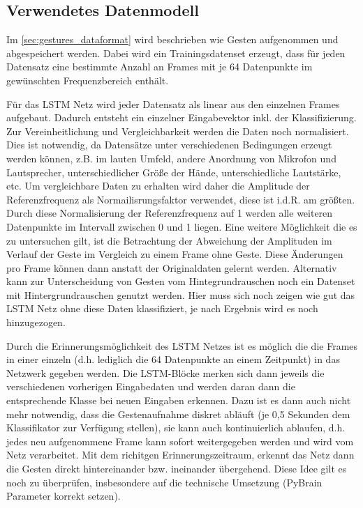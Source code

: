 \subsection{Verwendetes Datenmodell}
\label{sec:lstm_data}

Im \autoref{sec:gestures_dataformat} wird beschrieben wie Gesten aufgenommen und
abgespeichert werden. Dabei wird ein Trainingsdatenset erzeugt, dass für
jeden Datensatz eine bestimmte Anzahl an Frames mit je 64 Datenpunkte im
gewünschten Frequenzbereich enthält. 

Für das \ac{LSTM} Netz wird jeder Datensatz als linear aus den einzelnen Frames
aufgebaut. Dadurch entsteht ein einzelner Eingabevektor inkl. der
Klassifizierung. Zur Vereinheitlichung und Vergleichbarkeit werden die Daten
noch normalisiert.
Dies ist notwendig, da Datensätze unter verschiedenen Bedingungen erzeugt werden
können, z.B. im lauten Umfeld, andere Anordnung von Mikrofon und Lautsprecher,
unterschiedlicher Größe der Hände, unterschiedliche Lautstärke, etc. Um
vergleichbare Daten zu erhalten wird daher die Amplitude der Referenzfrequenz
als Normailisrungsfaktor verwendet, diese ist i.d.R. am größten. Durch diese
Normalisierung der Referenzfrequenz auf 1 werden alle weiteren Datenpunkte im
Intervall zwischen 0 und 1 liegen. Eine weitere Möglichkeit die es zu
untersuchen gilt, ist die Betrachtung der Abweichung der Amplituden im Verlauf
der Geste im Vergleich zu einem Frame ohne Geste. Diese Änderungen pro Frame
können dann anstatt der Originaldaten gelernt werden. Alternativ kann zur
Unterscheidung von Gesten vom Hintegrundrauschen noch ein Datenset mit
Hintergrundrauschen genutzt werden. Hier muss sich noch zeigen wie gut das
\ac{LSTM} Netz ohne diese Daten klassifiziert, je nach Ergebnis wird es noch
hinzugezogen. 

Durch die Erinnerungsmöglichkeit des \ac{LSTM} Netzes ist es möglich die die
Frames in einer einzeln (d.h. lediglich die 64 Datenpunkte an einem Zeitpunkt)
in das Netzwerk gegeben werden. Die \ac{LSTM}-Blöcke merken sich dann jeweils
die verschiedenen vorherigen Eingabedaten und werden daran dann die
entsprechende Klasse bei neuen Eingaben erkennen. Dazu ist es dann auch nicht
mehr notwendig, dass die Gestenaufnahme diskret abläuft (je 0,5 Sekunden dem
Klassifikator zur Verfügung stellen), sie kann auch kontinuierlich ablaufen,
d.h. jedes neu aufgenommene Frame kann sofort weitergegeben werden und wird vom
Netz verarbeitet. Mit dem richitgen Erinnerungszeitraum, erkennt das Netz dann
die Gesten direkt hintereinander bzw. ineinander übergehend. Diese Idee gilt es
noch zu überprüfen, insbesondere auf die technische Umsetzung (PyBrain
Parameter korrekt setzen).




\nocite{GERS2001,WIKI2013,Schmidhuber2013,LSTM1,Nerbonne1}

